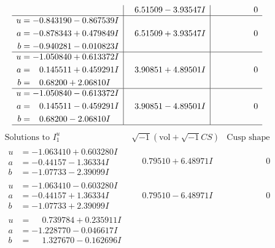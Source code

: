 \documentclass[1p]{elsarticle_modified}
\theoremstyle{definition}
\newcommand{\I}{\sqrt{-1}}
\begin{document}
$$\begin{array}{c|c|c}
 & \phantom{-}6.51509 - 3.93547 I & \phantom{-0.000000 } 0 \\ \hline\begin{aligned}
u &= -0.843190 - 0.867539 I \\
a &= -0.878343 + 0.479849 I \\
b &= -0.940281 - 0.010823 I\end{aligned}
 & \phantom{-}6.51509 + 3.93547 I & \phantom{-0.000000 } 0 \\ \hline\begin{aligned}
u &= -1.050840 + 0.613372 I \\
a &= \phantom{-}0.145511 + 0.459291 I \\
b &= \phantom{-}0.68200 + 2.06810 I\end{aligned}
 & \phantom{-}3.90851 + 4.89501 I & \phantom{-0.000000 } 0 \\ \hline\begin{aligned}
u &= -1.050840 - 0.613372 I \\
a &= \phantom{-}0.145511 - 0.459291 I \\
b &= \phantom{-}0.68200 - 2.06810 I\end{aligned}
 & \phantom{-}3.90851 - 4.89501 I & \phantom{-0.000000 } 0\\
 \hline 
 \end{array}$$\newpage$$\begin{array}{c|c|c}  
\text{Solutions to }I^u_{1}& \I (\text{vol} + \sqrt{-1}CS) & \text{Cusp shape}\\
 \hline 
\begin{aligned}
u &= -1.063410 + 0.603280 I \\
a &= -0.44157 - 1.36334 I \\
b &= -1.07733 - 2.39099 I\end{aligned}
 & \phantom{-}0.79510 + 6.48971 I & \phantom{-0.000000 } 0 \\ \hline\begin{aligned}
u &= -1.063410 - 0.603280 I \\
a &= -0.44157 + 1.36334 I \\
b &= -1.07733 + 2.39099 I\end{aligned}
 & \phantom{-}0.79510 - 6.48971 I & \phantom{-0.000000 } 0 \\ \hline\begin{aligned}
u &= \phantom{-}0.739784 + 0.235911 I \\
a &= -1.228770 - 0.046617 I \\
b &= \phantom{-}1.327670 - 0.162696 I\end{aligned}

\end{array}$$
\end{document}
